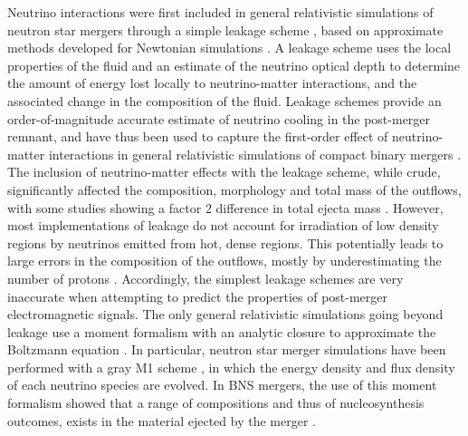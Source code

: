Neutrino interactions were first included in general relativistic simulations of neutron star mergers through a simple leakage scheme \cite{sekiguchi:2011zd}, based on approximate methods developed for Newtonian simulations \cite{ruffert1996,rosswog:2003rv}. A leakage scheme uses the local properties of the fluid and an estimate of the neutrino optical depth to determine the amount of energy lost locally to neutrino-matter interactions, and the associated change in the composition of the fluid. Leakage schemes provide an order-of-magnitude accurate estimate of neutrino cooling in the post-merger remnant, and have thus been used to capture the first-order effect of neutrino-matter interactions in general relativistic simulations of compact binary mergers \cite{sekiguchi:2011zd,wanajo2014,lehner2016unequal,radice2016dynamical,palenzuela2015,deaton2013black,foucart2014neutron}. The inclusion of neutrino-matter effects with the leakage scheme, while crude, significantly affected the composition, morphology and total mass of the outflows, with some studies showing a factor 2 difference in total ejecta mass \cite{radice2016dynamical}. However, most implementations of leakage do not account for irradiation of low density regions by neutrinos emitted from hot, dense regions. This potentially leads to large errors in the composition of the outflows, mostly by underestimating the number of protons \cite{foucartm1:2016,foucart2015post}. Accordingly, the simplest leakage schemes are very inaccurate when attempting to predict the properties of post-merger electromagnetic signals. The only general relativistic simulations going beyond leakage use a moment formalism with an analytic closure to approximate the Boltzmann equation \cite{1981mnras.194..439t,shibata:11}. In particular, neutron star merger simulations have been performed with a gray M1 scheme \cite{foucartm1:2016,foucart2015post,sekiguchi2015dynamical,sekiguchi2016dynamical}, in which the energy density and flux density of each neutrino species are evolved. In BNS mergers, the use of this moment formalism showed that a range of compositions and thus of nucleosynthesis outcomes, exists in the material ejected by the merger \cite{wanajo2014}. 

